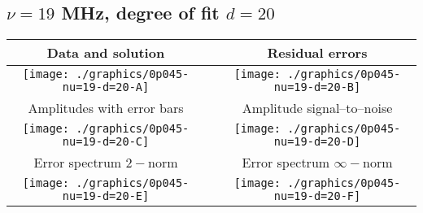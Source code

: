 

% 

\clearpage{}
\break{}

\subsection{$\nu = 19$ MHz, degree of fit $d = 20$}

\begin{table}[h]
    \begin{center}
        \begin{tabular}{ccc}
            Data and solution & \quad & Residual errors \\\hline
            \texttt{[image: ./graphics/0p045-nu=19-d=20-A]} &&
            \texttt{[image: ./graphics/0p045-nu=19-d=20-B]} \\[15pt]
            Amplitudes with error bars && Amplitude signal--to--noise \\\hline
            \texttt{[image: ./graphics/0p045-nu=19-d=20-C]} &&
            \texttt{[image: ./graphics/0p045-nu=19-d=20-D]} \\[15pt]
            Error spectrum $2-$norm && Error spectrum $\infty-$norm \\\hline
            \texttt{[image: ./graphics/0p045-nu=19-d=20-E]} &&
            \texttt{[image: ./graphics/0p045-nu=19-d=20-F]} \\[15pt]
        \end{tabular}
    \end{center}
\label{fig:elev=45, nu=19}
\end{table}



\endinput
